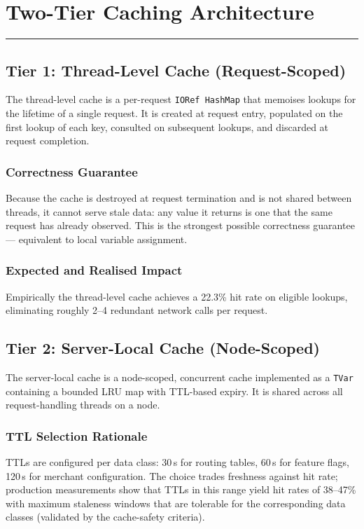 \documentclass[12pt,a4paper,oneside]{report}
\begin{document}

\chapter{Two-Tier Caching Architecture}
\label{chap:cache}
\vspace{-1cm}
\noindent \rule{6.6in}{0.01in}

\section[Tier 1: Thread-Level Cache]{Tier 1: Thread-Level Cache (Request-Scoped)}
The thread-level cache is a per-request \texttt{IORef HashMap} that memoises lookups for the lifetime of a single request. It is created at request entry, populated on the first lookup of each key, consulted on subsequent lookups, and discarded at request completion.

\subsection{Correctness Guarantee}
Because the cache is destroyed at request termination and is not shared between threads, it cannot serve stale data: any value it returns is one that the same request has already observed. This is the strongest possible correctness guarantee --- equivalent to local variable assignment.

\subsection{Expected and Realised Impact}
Empirically the thread-level cache achieves a 22.3\% hit rate on eligible lookups, eliminating roughly 2--4 redundant network calls per request.

\section[Tier 2: Server-Local Cache]{Tier 2: Server-Local Cache (Node-Scoped)}
The server-local cache is a node-scoped, concurrent cache implemented as a \texttt{TVar} containing a bounded LRU map with TTL-based expiry. It is shared across all request-handling threads on a node.

\subsection{TTL Selection Rationale}
TTLs are configured per data class: 30\,s for routing tables, 60\,s for feature flags, 120\,s for merchant configuration. The choice trades freshness against hit rate; production measurements show that TTLs in this range yield hit rates of 38--47\% with maximum staleness windows that are tolerable for the corresponding data classes (validated by the cache-safety criteria).
\end{document}
